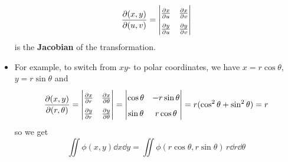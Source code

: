 \documentclass[../main.tex]{subfiles}
\begin{document}
\begin{itemize}
\begin{equation*}
        \renewcommand{\arraystretch}{1.6}
        \pdv{(x,y)}{(u,v)} =
        \begin{vmatrix}
            \pdv{x}{u} & \pdv{x}{v}\\
            \pdv{y}{u} & \pdv{y}{v}\\
        \end{vmatrix}
    \end{equation*}
    is the \textbf{Jacobian} of the transformation.
    \item For example, to switch from $xy$- to polar coordinates, we have $x=r\cos\theta$, $y=r\sin\theta$ and
    \begin{equation*}
        \renewcommand{\arraystretch}{1.6}
        \pdv{(x,y)}{(r,\theta)} =
        \begin{vmatrix}
            \pdv{x}{r} & \pdv{x}{\theta}\\
            \pdv{y}{r} & \pdv{y}{\theta}\\
        \end{vmatrix}
        =
        \begin{vmatrix}
            \cos\theta & -r\sin\theta\\
            \sin\theta & r\cos\theta\\
        \end{vmatrix}
        = r(\cos^2\theta+\sin^2\theta)
        = r
    \end{equation*}
    so we get
    \begin{equation*}
        \iint\phi(x,y)\dd{x}\dd{y} = \iint\phi(r\cos\theta,r\sin\theta)\, r\dd{r}\dd{\theta}
    \end{equation*}
\end{itemize}
\end{document}
